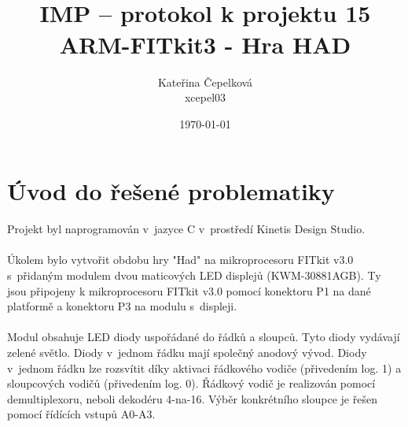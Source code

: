 \documentclass[]{fitiel} %
\title{\logo
        \newline
        \\IMP -- protokol k projektu 15
        \\ARM-FITkit3 - Hra HAD}
\author{Kateřina Čepelková \\ xcepel03}
\date{\today}
\begin{document}
	\maketitle
    
    \newpage
	\tableofcontents

    \newpage
    \section{Úvod do řešené problematiky}
    Projekt byl naprogramován v~jazyce C v~prostředí Kinetis Design Studio.
    \\\\
    Úkolem bylo vytvořit obdobu hry "Had" na mikroprocesoru FITkit v3.0 s~přidaným modulem dvou maticových LED displejů (KWM-30881AGB). Ty jsou připojeny k mikroprocesoru FITkit v3.0 pomocí konektoru P1 na dané platformě a konektoru P3 na modulu s~displeji.
    \\\\
    Modul obsahuje LED diody uspořádané do řádků a sloupců. Tyto diody vydávají zelené světlo. Diody v~jednom řádku mají společný anodový vývod. Diody v~jednom řádku lze rozsvítit díky aktivaci řádkového vodiče (přivedením log. 1) a sloupcových vodičů (přivedením log. 0). Řádkový vodič je realizován pomocí demultiplexoru, neboli dekodéru 4-na-16. Výběr konkrétního sloupce je řešen pomocí řídících vstupů A0-A3.
    
    \newpage
\end{document}

